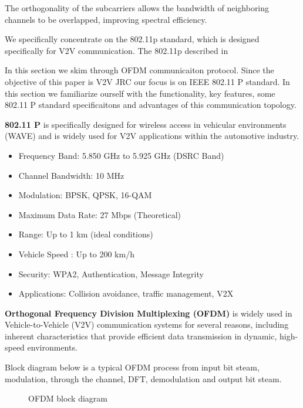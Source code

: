 \documentclass[conference]{IEEEtran}
\begin{document}
	 	 The orthogonality of the subcarriers allows the bandwidth of neighboring channels to be overlapped, improving spectral efficiency.
	 	
	 	
	 	We specifically concentrate on the 802.11p standard, which is designed specifically for V2V communication. The 802.11p described in \cite{802_11p_phy_abdelgader}
	 	
	     In this section we skim through OFDM communicaiton protocol. Since the objective of this paper is V2V JRC our focus is on IEEE 802.11 P standard. In this section we familiarize ourself with the functionality, key features, some 802.11 P standard specificaitons and advantages of this communication topology.\par
    \textbf{  802.11 P} is specifically designed for wireless access in vehicular environments (WAVE) and is widely used for V2V applications within the automotive industry.
      
      \begin{itemize}
      \item Frequency Band:		5.850 GHz to 5.925 GHz (DSRC Band)
	\item Channel Bandwidth:	10 MHz
	\item Modulation:		BPSK, QPSK, 16-QAM
	\item Maximum Data Rate:	27 Mbps (Theoretical)
	\item Range: 			Up to 1 km (ideal conditions)
	\item Vehicle Speed :                Up to 200 km/h
	\item Security:			WPA2, Authentication, Message Integrity
	\item Applications:		Collision avoidance, traffic management, V2X
	\end{itemize}
	
 \textbf{ Orthogonal Frequency Division Multiplexing (OFDM)} is widely used in Vehicle-to-Vehicle (V2V) communication systems for several reasons, including inherent characteristics that provide efficient data transmission in dynamic, high-speed environments.

Block diagram below is a typical OFDM process from input bit steam, modulation, through the channel, DFT, demodulation and output bit steam. 

		\begin{figure}[H]
	    		\centering
	    		\caption{OFDM block diagram}
		\end{figure}
      
\end{document}
